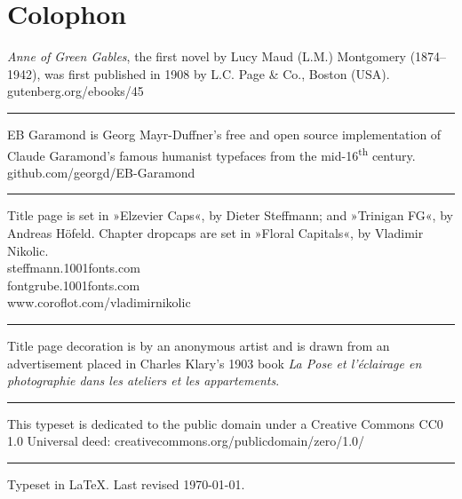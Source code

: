 \documentclass[
paper=5.5in:8.5in,
]{scrbook} %
\begin{document}
\chapter*{Colophon}
\begin{center}
\textit{Anne of Green Gables}, the first novel by Lucy Maud (L.M.) Montgomery (1874–1942), was first published in 1908 by L.C. Page \& Co., Boston (USA).\\gutenberg.org/ebooks/45
\vfill
\rule{0.5\textwidth}{.4pt}
\vfill
EB Garamond is Georg Mayr-Duffner's free and open source implementation of Claude Garamond’s famous humanist typefaces from the mid-16\textsuperscript{th} century.\\github.com/georgd/EB-Garamond
\vfill
\rule{0.5\textwidth}{.4pt}
\vfill
Title page is set in »Elzevier Caps«, by Dieter Steffmann; and »Trinigan FG«, by Andreas Höfeld. Chapter dropcaps are set in »Floral Capitals«, by Vladimir Nikolic. \\steffmann.1001fonts.com\\fontgrube.1001fonts.com\\www.coroflot.com/vladimirnikolic
\vfill
\rule{0.5\textwidth}{.4pt}
\vfill
Title page decoration is by an anonymous artist and is drawn from an advertisement placed in Charles Klary's 1903 book \textit{La Pose et l’éclairage en photographie dans les ateliers et les appartements}.
\vfill
\rule{0.5\textwidth}{.4pt}
\vfill

This typeset is dedicated to the public domain under a Creative Commons CC0 1.0 Universal deed: creativecommons.org/publicdomain/zero/1.0/
\vfill
\rule{0.5\textwidth}{.4pt}
\vfill
Typeset in \LaTeX{}. Last revised \today.
\end{center}
\thispagestyle{empty}
\end{document}
